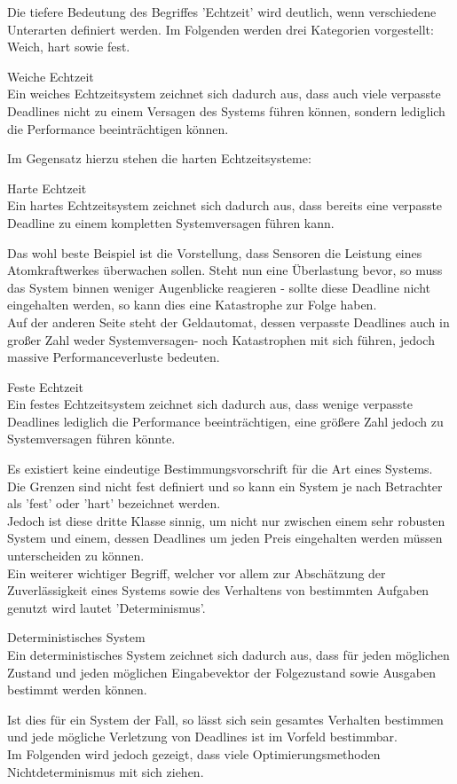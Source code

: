 Die tiefere Bedeutung des Begriffes 'Echtzeit' wird deutlich, wenn verschiedene Unterarten definiert werden. Im Folgenden werden drei Kategorien vorgestellt: Weich, hart sowie fest.\\
\begin{definition}{Weiche Echtzeit}\\
Ein weiches Echtzeitsystem zeichnet sich dadurch aus, dass auch viele verpasste Deadlines nicht zu einem Versagen des Systems führen können, sondern lediglich die Performance beeinträchtigen können.
\end{definition}
Im Gegensatz hierzu stehen die harten Echtzeitsysteme:\\
\begin{definition}{Harte Echtzeit}\\
Ein hartes Echtzeitsystem zeichnet sich dadurch aus, dass bereits eine verpasste Deadline zu einem kompletten Systemversagen führen kann.
\end{definition}
Das wohl beste Beispiel ist die Vorstellung, dass Sensoren die Leistung eines Atomkraftwerkes überwachen sollen. Steht nun eine Überlastung bevor, so muss das System binnen weniger Augenblicke reagieren - sollte diese Deadline nicht eingehalten werden, so kann dies eine Katastrophe zur Folge haben.\\
Auf der anderen Seite steht der Geldautomat, dessen verpasste Deadlines auch in großer Zahl weder Systemversagen- noch Katastrophen mit sich führen, jedoch massive Performanceverluste bedeuten.\\
\begin{definition}{Feste Echtzeit}\\
Ein festes Echtzeitsystem zeichnet sich dadurch aus, dass wenige verpasste Deadlines lediglich die Performance beeinträchtigen, eine größere Zahl jedoch zu Systemversagen führen könnte.
\end{definition}
Es existiert keine eindeutige Bestimmungsvorschrift für die Art eines Systems. Die Grenzen sind nicht fest definiert und so kann ein System je nach Betrachter als 'fest' oder 'hart' bezeichnet werden.\\
Jedoch ist diese dritte Klasse sinnig, um nicht nur zwischen einem sehr robusten System und einem,
dessen Deadlines um jeden Preis eingehalten werden müssen unterscheiden zu können.\\
Ein weiterer wichtiger Begriff, welcher vor allem zur Abschätzung der Zuverlässigkeit eines Systems sowie des Verhaltens von bestimmten Aufgaben genutzt wird lautet 'Determinismus'.\\
\begin{definition}{Deterministisches System}\\
Ein deterministisches System zeichnet sich dadurch aus, dass für jeden möglichen Zustand und jeden möglichen Eingabevektor der Folgezustand sowie Ausgaben bestimmt werden können.
\end{definition}
Ist dies für ein System der Fall, so lässt sich sein gesamtes Verhalten bestimmen und jede mögliche Verletzung von Deadlines ist im Vorfeld bestimmbar.\\
Im Folgenden wird jedoch gezeigt, dass viele Optimierungsmethoden Nichtdeterminismus mit sich ziehen.
